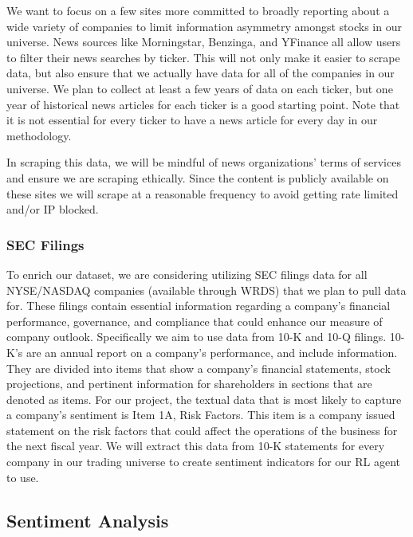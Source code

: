 We want to focus on a few sites more committed to broadly reporting about a wide 
variety of companies to limit information asymmetry amongst stocks in our universe. 
News sources like Morningstar, Benzinga, and YFinance all allow users to filter their 
news searches by ticker. This will not only make it easier to scrape data, but also 
ensure that we actually have data for all of the companies in our universe. We plan
to collect at least a few years of data on each ticker, but one year of historical 
news articles for each ticker is a good starting point. Note that it is not essential 
for every ticker to have a news article for every day in our methodology. 

In scraping this data, we will be mindful of news organizations’ terms of 
services and ensure we are scraping ethically. Since the content is publicly 
available on these sites we will scrape at a reasonable frequency to avoid getting 
rate limited and/or IP blocked.



\subsubsection{SEC Filings}

To enrich our dataset, we are considering utilizing SEC filings data for all 
NYSE/NASDAQ companies (available through WRDS) that we plan to pull data for. 
These filings contain essential information regarding a company's financial 
performance, governance, and compliance that could enhance our measure of 
company outlook. Specifically we aim to use data from 10-K and 10-Q filings. 
10-K’s are an annual report on a company’s performance, and include information. 
They are divided into items that show a company’s financial statements, 
stock projections, and pertinent information for shareholders in sections that 
are denoted as items. For our project, the textual data that is most likely to 
capture a company’s sentiment is Item 1A, Risk Factors. This item is a company 
issued statement on the risk factors that could affect the operations of the 
business for the next fiscal year. We will extract this data from 10-K statements 
for every company in our trading universe to create sentiment indicators for our 
RL agent to use. 

\subsection{Sentiment Analysis}

